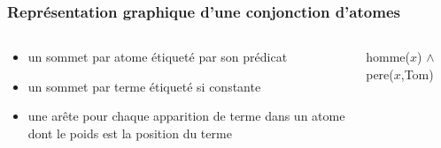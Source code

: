 \begin{frame}
	\frametitle{Représentation graphique d'une conjonction d'atomes}

	\begin{columns}
	
	\begin{column}{0.45\linewidth}
		\begin{itemize}
			\item un sommet par atome étiqueté par son prédicat %
			\item un sommet par terme étiqueté si constante %
			\item une arête pour chaque apparition de terme dans un atome 
			dont le poids est la position du terme %
		\end{itemize}
	\end{column}
	\vline
	\hfill
	\begin{column}{0.45\linewidth}
		\begin{center}
		homme($x$) $\wedge$ pere($x$,Tom)
		\end{center}
		\begin{figure}
		\end{figure}
	\end{column}
	\end{columns}
\end{frame}


